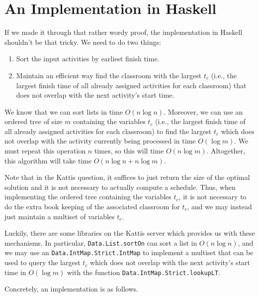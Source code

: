 \documentclass{article}
\theoremstyle{plain}%
\theoremstyle{definition}
\theoremstyle{remark}
\begin{document}
\section{An Implementation in Haskell}
If we made it through that rather wordy proof, the implementation in
    Haskell shouldn't be that tricky.
We need to do two things:
\begin{enumerate}
    \item Sort the input activities by earliest finish time.
    \item Maintain an efficient way find the classroom with the largest 
        $t_c$ (i.e., the largest finish time of all already assigned
        activities for each classroom) that does not overlap with the next activity's start time.
\end{enumerate}
We know that we can sort lists in time $O(n \log n)$. 
Moreover, we can use an ordered
    tree of size $m$ containing the variables $t_c$ (i.e., the largest finish
    time of all already assigned activities for each classroom) to find the
    largest $t_c$ which does not overlap with the activity currently being
    processed in time $O(\log m)$.
We must repeat this operation $n$ times, so this will time $O(n \log m)$.
Altogether, this algorithm will take time $O(n \log n + n \log m)$.

Note that in the Kattis question, 
    it suffices to just return the size of the optimal solution and it is not
    necessary to actually compute a schedule.
Thus, when implementing the ordered tree containing the variables $t_c$, 
    it is not necessary to do the extra book keeping of the associated
    classroom for $t_c$, and we may instead just maintain a multiset of
    variables $t_c$.

Luckily, there are some libraries on the Kattis server which provides us with
these mechanisms.
In particular, \lstinline{Data.List.sortOn} can sort a list in $O(n \log n)$,
    and we may use an \lstinline{Data.IntMap.Strict.IntMap} to implement a
    multiset that can be used to query the largest $t_c$ which does not overlap
    with the next activity's start time in $O(\log m)$ with the function
    \lstinline{Data.IntMap.Strict.lookupLT}.

Concretely, an implementation is as follows.

\end{document}

